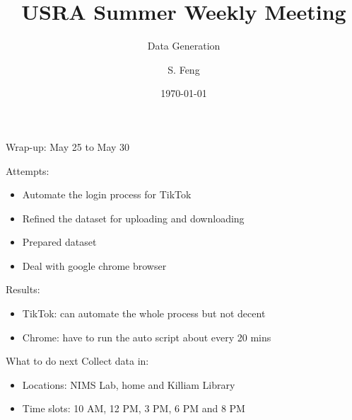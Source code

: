 \documentclass{beamer}
\title[Weekly Meeting]{
    USRA Summer Weekly Meeting
}
\subtitle[]{Data Generation}
\author[Shuo Feng]{S. Feng}
\institute[NIMS Lab]{
  NIMS Lab\\
  USRA Summer 2023}
\date{\today}
\begin{document}
\frame{\titlepage}

\begin{frame}{Wrap-up: May 25 to May 30}

  Attempts:
  \begin{itemize}
    \item Automate the login process for TikTok
    \item Refined the dataset for uploading and downloading
    \item Prepared dataset
    \item Deal with google chrome browser
  \end{itemize}

  Results:
  \begin{itemize}
    \item TikTok: can automate the whole process but not decent
    \item Chrome: have to run the auto script about every 20 mins
  \end{itemize}

\end{frame}

\begin{frame}{What to do next}
  Collect data in:
  \begin{itemize}
    \item Locations: NIMS Lab, home and Killiam Library
    \item Time slots: 10 AM, 12 PM, 3 PM, 6 PM and 8 PM
  \end{itemize}


\end{frame}
\end{document}
